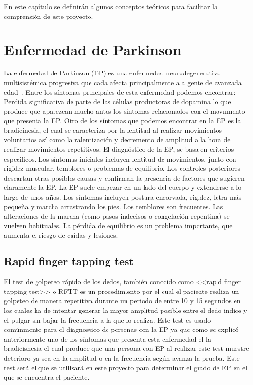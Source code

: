 
En este capítulo se definirán algunos conceptos teóricos para facilitar la comprensión de este proyecto.

\section{Enfermedad de Parkinson}

La enfermedad de Parkinson (EP) es una  enfermedad neurodegenerativa multisistémica progresiva que cada afecta principalmente a a gente de avanzada edad~\cite{pdsymptoms}. 
Entre los síntomas principales de esta enfermedad podemos encontrar:
Perdida significativa de parte de las células productoras de dopamina lo que produce que aparezcan mucho antes los síntomas relacionados con el movimiento que presenta la EP. Otro de los síntomas que podemos encontrar en la EP es la bradicinesia, el cual se caracteriza por la lentitud al realizar movimientos voluntarios así como la ralentización y decremento de amplitud a la hora de realizar movimientos repetitivos.
El diagnóstico de la EP, se basa en criterios específicos. Los síntomas iniciales incluyen lentitud de movimientos, junto con rigidez muscular, temblores o problemas de equilibrio. Los controles posteriores descartan otras posibles causas y confirman la presencia de factores que sugieren claramente la EP.
La EP suele empezar en un lado del cuerpo y extenderse a lo largo de unos años. Los síntomas incluyen postura encorvada, rigidez, letra más pequeña y marcha arrastrando los pies. Los temblores son frecuentes.
Las alteraciones de la marcha (como pasos indecisos o congelación repentina) se vuelven habituales. La pérdida de equilibrio es un problema importante, que aumenta el riesgo de caídas y lesiones.

\subsection{Rapid finger tapping test}

El test de golpeteo rápido de los dedos, también conocido como <<rapid finger tapping test>> o RFTT es un procedimiento por el cual el paciente realiza un golpeteo de manera repetitiva durante un periodo de entre 10 y 15 segundos en los cuales ha de intentar generar la mayor amplitud posible entre el dedo indice y el pulgar sin bajar la frecuencia a la que lo realiza. Este test es usado comúnmente para el diagnostico de personas con la EP ya que como se explicó anteriormente uno de los síntomas que presenta esta enfermedad el la bradicisnesia el cual produce que una persona con EP al realizar este test muestre deterioro ya sea en la amplitud o en la frecuencia según avanza la prueba. Este test será el que se utilizará en este proyecto para determinar el grado de EP en el que se encuentra el paciente.

